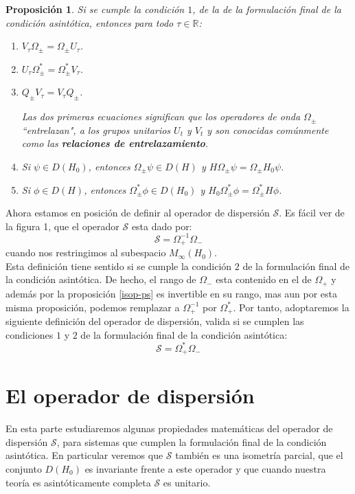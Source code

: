 \documentclass[12pt]{book}
\numberwithin{equation}{chapter}
\newtheorem{proposition}[theorem]{Proposici\'on}
\def\R{\mathbb{R}}
\def\S{\mathcal{S}}
\def\O{\Omega}
\begin{document}
\begin{proposition}\label{oms-pr}
Si se cumple la condici\'on $1$, de la de la formulaci\'on final de la condici\'on asint\'otica, entonces para todo $\tau \in \R$:
\begin{enumerate}
\item $V_{\tau} \O_{\pm}= \O_{\pm} U_{\tau}$.
\item  $ U_{\tau} \O_{\pm}^{*}= \O_{\pm}^{*} V_{\tau} $.
\item $ Q_{\pm}V_{\tau} = V_{\tau} Q_{\pm} $.

Las dos primeras ecuaciones significan que los operadores de onda $\O_{\pm}$ ``entrelazan", a los grupos unitarios $U_{t}$ y $V_{t}$ y son conocidas com\'unmente como las {\bf relaciones de entrelazamiento}.

\item Si $ \psi \in D(H_{0}) $, entonces $\O_{\pm} \psi \in D(H)$ y $ H \O_{\pm} \psi=\O_{\pm} H_{0} \psi $.

\item Si $\phi \in D(H)$, entonces $ \O_{\pm}^{*} \phi \in D(H_{0}) $ y $ H_{0}\O_{\pm}^{*} \phi = \O_{\pm}^{*} H \phi $.
\end{enumerate}
\end{proposition}

Ahora estamos en posici\'on de definir al operador de dispersi\'on $\S$. Es f\'acil ver de la figura 1, que el operador $\S$ esta dado por:
\begin{equation}
\S = \O_{+}^{-1} \O_{-}
\end{equation}
cuando nos restringimos al subespacio $M_{\infty}(H_{0})$.\\
Esta definici\'on tiene sentido si se cumple la condici\'on $2$ de la formulaci\'on final de la condici\'on asint\'otica. De hecho, el rango de $\O_{-}$ esta contenido en el de $\O_{+}$ y adem\'as por la proposici\'on \ref{isop-ps} es invertible en su rango, mas aun por esta misma proposici\'on, podemos remplazar a $\O_{+}^{-1}$ por $\O_{+}^{*}$. Por tanto, adoptaremos la siguiente definici\'on del operador de dispersi\'on, valida si se cumplen las condiciones $1$ y $2$ de la formulaci\'on final de la condici\'on asint\'otica:
\begin{equation}\label{op-dis}
\S = \O_{+}^{*} \O_{-}
\end{equation}

\newpage

\section{El operador de dispersi\'on}
En esta parte estudiaremos algunas propiedades matem\'aticas del operador de dispersi\'on $\S$, para sistemas que cumplen la formulaci\'on final de la condici\'on asint\'otica. En particular veremos que $\S$ tambi\'en es una isometr\'ia parcial, que el conjunto $D(H_{0})$ es invariante frente a este operador y que cuando nuestra teor\'ia es asint\'oticamente completa $\S$ es unitario.
\end{document}
